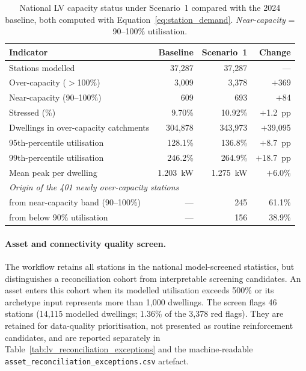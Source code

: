 \documentclass[preprint,12pt]{elsarticle}
\begin{document}
\begin{table}[H]
\centering
\caption{National LV capacity status under Scenario~1 compared with the
  2024 baseline, both computed with Equation~\eqref{eq:station_demand}.
  \textit{Near-capacity} = 90--100\% utilisation.}
\label{tab:lv_scenario_summary}
\small
\begin{tabular}{lrrr}
\toprule
\textbf{Indicator} & \textbf{Baseline} & \textbf{Scenario~1} &
  \textbf{Change} \\
\midrule
Stations modelled                     & 37{,}287 & 37{,}287 & --- \\
Over-capacity ($>$100\%)              &  3{,}009 &  3{,}378 & $+$369 \\
Near-capacity (90--100\%)             &     609  &     693  & $+$84 \\
Stressed (\%)                         &    9.70\% &  10.92\% & $+$1.2~pp \\
Dwellings in over-capacity catchments & 304{,}878 & 343{,}973 & $+$39{,}095 \\
95th-percentile utilisation           &   128.1\% &   136.8\% & $+$8.7~pp \\
99th-percentile utilisation           &   246.2\% &   264.9\% & $+$18.7~pp \\
Mean peak per dwelling                &  1.203~kW &  1.275~kW & $+$6.0\% \\
\midrule
\multicolumn{4}{l}{\textit{Origin of the 401 newly over-capacity stations}} \\
\quad from near-capacity band (90--100\%) & --- & 245 & 61.1\% \\
\quad from below 90\% utilisation         & --- & 156 & 38.9\% \\
\bottomrule
\end{tabular}
\end{table}

\paragraph{Asset and connectivity quality screen.}
The workflow retains all stations in the national model-screened statistics,
but distinguishes a reconciliation cohort from interpretable screening
candidates. An asset enters this cohort when its modelled utilisation exceeds
500\% or its archetype input represents more than 1,000 dwellings. The screen
flags 46 stations (14,115 modelled dwellings; 1.36\% of the 3,378 red flags).
They are retained for data-quality prioritisation, not presented as routine
reinforcement candidates, and are reported separately in
Table~\ref{tab:lv_reconciliation_exceptions} and the machine-readable
\texttt{asset\_reconciliation\_exceptions.csv} artefact.
\end{document}
